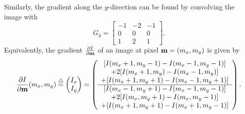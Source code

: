 Similarly, the gradient along the $y$-direction can be found by convolving the image with
\[
G_y = \left[\begin{array}{c|c|c}
-1 & -2 & -1  \\\hline 0 & 0 & 0  \\\hline 1 & 2 & 1
\end{array} \right].
\]
Equivalently, the gradient $\frac{\partial I}{\partial \mathbf{m}}$ of an image at pixel $\mathbf{m}=(m_x, m_y)$ is given by
\begin{equation}\label{eq:image_gradient}
\frac{\partial I}{\partial \mbf}(m_x, m_y) \defeq
\begin{pmatrix} I_x \\ I_y \end{pmatrix}
= \left(\begin{array}{c}
[I(m_x+1, m_y-1)-I(m_x-1,m_y-1)] \\
+ 2[I(m_x+1, m_y)-I(m_x-1,m_y)] \\
+ [I(m_x+1, m_y+1)-I(m_x-1,m_y+1)] \\\hline
 [I(m_x-1, m_y+1)-I(m_x-1,m_y-1)] \\
+ 2[I(m_x, m_y+1)-I(m_x,m_y-1)] \\
+ [I(m_x+1, m_y+1)-I(m_x+1,m_y-1)]
\end{array}\right).
\end{equation}

